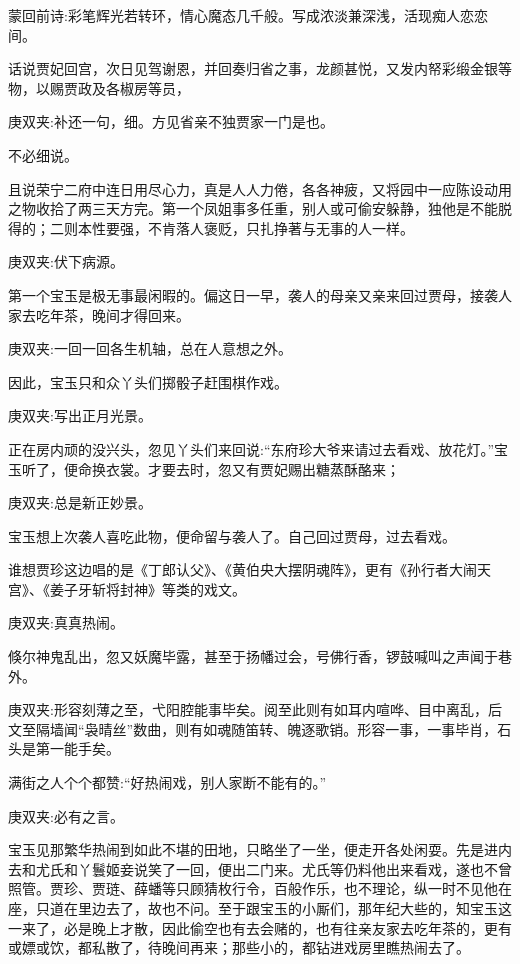

\begin{parag}
    \begin{note}蒙回前诗:彩笔辉光若转环，情心魔态几千般。写成浓淡兼深浅，活现痴人恋恋间。\end{note}
\end{parag}


\begin{parag}
    话说贾妃回宫，次日见驾谢恩，并回奏归省之事，龙颜甚悦，又发内帑彩缎金银等物，以赐贾政及各椒房等员，\begin{note}庚双夹:补还一句，细。方见省亲不独贾家一门是也。\end{note}不必细说。
\end{parag}


\begin{parag}
    且说荣宁二府中连日用尽心力，真是人人力倦，各各神疲，又将园中一应陈设动用之物收拾了两三天方完。第一个凤姐事多任重，别人或可偷安躲静，独他是不能脱得的；二则本性要强，不肯落人褒贬，只扎挣著与无事的人一样。\begin{note}庚双夹:伏下病源。\end{note}第一个宝玉是极无事最闲暇的。偏这日一早，袭人的母亲又亲来回过贾母，接袭人家去吃年茶，晚间才得回来。\begin{note}庚双夹:一回一回各生机轴，总在人意想之外。\end{note}因此，宝玉只和众丫头们掷骰子赶围棋作戏。\begin{note}庚双夹:写出正月光景。\end{note}正在房内顽的没兴头，忽见丫头们来回说:“东府珍大爷来请过去看戏、放花灯。”宝玉听了，便命换衣裳。才要去时，忽又有贾妃赐出糖蒸酥酪来；\begin{note}庚双夹:总是新正妙景。\end{note}宝玉想上次袭人喜吃此物，便命留与袭人了。自己回过贾母，过去看戏。
\end{parag}


\begin{parag}
    谁想贾珍这边唱的是《丁郎认父》、《黄伯央大摆阴魂阵》，更有《孙行者大闹天宫》、《姜子牙斩将封神》等类的戏文。\begin{note}庚双夹:真真热闹。\end{note}倏尔神鬼乱出，忽又妖魔毕露，甚至于扬幡过会，号佛行香，锣鼓喊叫之声闻于巷外。\begin{note}庚双夹:形容刻薄之至，弋阳腔能事毕矣。阅至此则有如耳内喧哗、目中离乱，后文至隔墙闻“袅晴丝”数曲，则有如魂随笛转、魄逐歌销。形容一事，一事毕肖，石头是第一能手矣。\end{note}满街之人个个都赞:“好热闹戏，别人家断不能有的。”\begin{note}庚双夹:必有之言。\end{note}宝玉见那繁华热闹到如此不堪的田地，只略坐了一坐，便走开各处闲耍。先是进内去和尤氏和丫鬟姬妾说笑了一回，便出二门来。尤氏等仍料他出来看戏，遂也不曾照管。贾珍、贾琏、薛蟠等只顾猜枚行令，百般作乐，也不理论，纵一时不见他在座，只道在里边去了，故也不问。至于跟宝玉的小厮们，那年纪大些的，知宝玉这一来了，必是晚上才散，因此偷空也有去会赌的，也有往亲友家去吃年茶的，更有或嫖或饮，都私散了，待晚间再来；那些小的，都钻进戏房里瞧热闹去了。
\end{parag}


